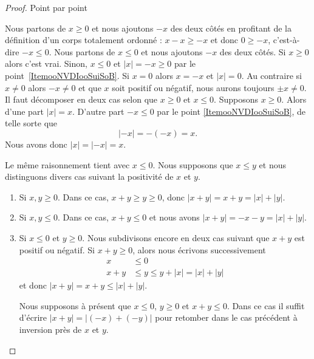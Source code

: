 \begin{proof}
	Point par point
	\begin{subproof}
		\spitem[\ref{ItemooNVDIooSuiSoB}]
		Nous partons de \( x\geq 0\) et nous ajoutons \( -x\) des deux côtés en profitant de la définition d'un corps totalement ordonné : \( x-x\geq -x\) et donc \( 0\geq-x\), c'est-à-dire \( -x\leq 0\).
		\spitem[\ref{ITEMooVNAZooSxmtuH}]
		Nous partons de \( x\leq 0\) et nous ajoutons \( -x\) des deux côtés.
		\spitem[\ref{ITEMooSDNHooDnjScE}]
		Si \( x\geq 0\) alors c'est vrai. Sinon, \( x\leq 0\) et \( | x |=-x\geq 0\) par le point~\ref{ItemooNVDIooSuiSoB}.
		\spitem[\ref{ITEMooLQLTooTJTPVM}]
		Si \( x=0\) alors \( x=-x\) et \( | x |=0\). Au contraire si \(x\neq 0\) alors \( -x\neq 0\) et que \( x\) soit positif ou négatif, nous aurons toujours \( \pm x\neq 0\).
		\spitem[\ref{ITEMooVJAEooOEatzY}]
		Il faut décomposer en deux cas selon que \( x\geq 0\) et \( x\leq 0\). Supposons \( x\geq 0\). Alors d'une part \( | x |=x\). D'autre part \( -x\leq 0\) par le point \ref{ItemooNVDIooSuiSoB}, de telle sorte que
		\begin{equation}
			| -x |=-(-x)=x.
		\end{equation}
		Nous avons donc \( | x |=| -x |=x\).

		Le même raisonnement tient avec \( x\leq 0\).
		\spitem[\ref{ItemooOMKNooRlanvk}]
		Nous supposons que \( x\leq y\) et nous distinguons divers cas suivant la positivité de \( x\) et \( y\).
		\begin{enumerate}
			\item
			      Si \( x,y\geq 0\). Dans ce cas, \( x+y\geq y\geq 0\), donc \( | x+y |=x+y=| x |+| y |\).
			\item
			      Si \( x,y\leq 0\). Dans ce cas, \( x+y\leq 0\) et nous avons \( | x+y |=-x-y=| x |+| y |\).
			\item
			      Si \( x\leq 0\) et \( y\geq 0\). Nous subdivisons encore en deux cas suivant que \( x+y\) est positif ou négatif. Si \( x+y\geq 0\), alors nous écrivons successivement
			      \begin{subequations}
				      \begin{align}
					      x   & \leq 0                         \\
					      x+y & \leq y\leq y+| x |=| x |+| y |
				      \end{align}
			      \end{subequations}
			      et donc \( | x+y |=x+y\leq | x |+| y |\).

			      Nous supposons à présent que \( x\leq 0\), \( y\geq 0\) et \( x+y\leq 0\). Dans ce cas il suffit d'écrire \( | x+y |=| (-x)+(-y) |\) pour retomber dans le cas précédent à inversion près de \( x\) et \( y\).
		\end{enumerate}
	\end{subproof}
\end{proof}

